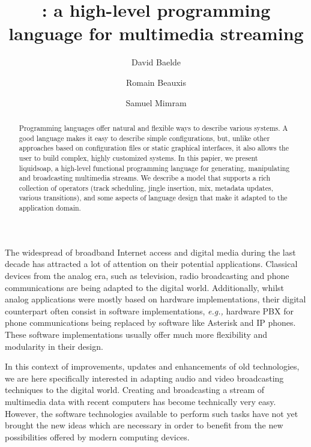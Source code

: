 \documentclass{llncs}
\title{\liquidsoap{}: a high-level programming language for multimedia streaming}
\author{David Baelde \and Romain Beauxis \and Samuel Mimram}
\newcommand{\eg}{{\em e.g.,}}
\begin{document}
\maketitle

\begin{abstract}
Programming languages offer natural and flexible ways to describe various
systems. A good language makes it easy to describe simple configurations, but,
unlike other approaches based on configuration files or static graphical
interfaces, it also allows the user to build complex, highly customized systems.
In this papier, we present liquidsoap, a high-level functional programming
language for generating, manipulating and broadcasting multimedia streams. We
describe a model that supports a rich collection of operators (track scheduling,
jingle insertion, mix, metadata updates, various transitions), and some aspects
of language design that make it adapted to the application domain.
\end{abstract}


The widespread of broadband Internet access and digital media during the last
decade has attracted a lot of attention on their potential applications.
Classical devices from the analog era, such as television, radio broadcasting
and phone communications are being adapted to the digital world. Additionally,
whilst analog applications were mostly based on hardware implementations, their
digital counterpart often consist in software implementations, \eg{} hardware
PBX for phone communications being replaced by software like Asterisk and IP
phones. These software implementations usually offer much more flexibility and
modularity in their design.

In this context of improvements, updates and enhancements of old technologies,
we are here specifically interested in adapting audio and video broadcasting
techniques to the digital world. Creating and broadcasting a stream of
multimedia data with recent computers has become technically very easy. However,
the software technologies available to perform such tasks have not yet brought
the new ideas which are necessary in order to benefit from the new possibilities
offered by modern computing devices.
\end{document}
